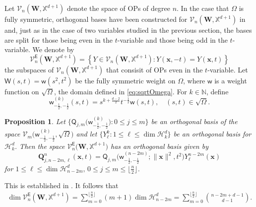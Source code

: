 \documentclass{amsart}
\newtheorem{prop}[thm]{Proposition}
\theoremstyle{remark}
\def\sw{{\mathsf w}}
\def\sE{{\mathsf E}}
\def\sO{{\mathsf O}}
\def\sQ{{\mathsf Q}}
\def\sW{{\mathsf W}}
\def\xb{{\mathbf x}}
\def\Qb{{\mathbf Q}}
\def\Wb{{\mathbf W}}
\def\CH{{\mathcal H}}
\def\CV{{\mathcal V}}
\def\NN{{\mathbb N}}
\def\XX{{\mathbb X}}
\def\f{\frac}
\begin{document}
Let $\CV_n(\Wb, \XX^{d+1})$ denote the space of OPs of degree $n$. In the case that $\Omega$ is fully
symmetric, orthogonal bases have been constructed for $\CV_n(\Wb, \XX^{d+1})$ in \cite{X24} and, just 
as in the case of two variables studied in the previous section, the bases are split for those being even 
in the $t$-variable and those being odd in the $t$-variable. We denote by 
$$
      \CV_n^{\sE}(\Wb, \XX^{d+1}) = \left\{Y \in \CV_n(\Wb, \XX^{d+1}): Y(\xb, - t) = Y(\xb,t) \right\}
$$ 
the subspaces of $\CV_n(\Wb, \XX^{d+1})$ that consisit of OPs even in the $t$-variable. 
Let $\sW(s,t) = \sw(s^2,t^2)$ be the fully symmetric weight on $\Omega$, where $\sw$ is a 
weight function on $\sqrt{\Omega}$, the domain defined in \eqref{eq:sqrtOmega}. For $k \in \NN$, define 
\begin{equation} \label{eq:Wk_fullsym}
    \sw_{-\f12, -\f12}^{(k)}(s,t) = s^{k+\frac{d-2}{2}} t^{-\f12} \sw(s,t), \quad (s,t) \in \sqrt{\Omega}. 
\end{equation}

\begin{prop} \label{prop:OP_fullSym}
Let $\big\{\sQ_{j,m}\big(\sw^{(k)}_{-\f12, -\f12}\big): 0 \le j \le m\big\}$ be an orthogonal basis of the
space $\CV_m\big(\sw^{(k)}_{- \f12, -\f12}, \sqrt{\Omega}\big)$ and let $\{Y_\ell^k: 1 \le \ell \le \dim \CH_k^d\}$ be 
an orthogonal basis for $\CH_k^d$. Then the space $\CV_n^\sE\big(\Wb,\XX^{d+1}\big)$ has an 
orthogonal basis given by 
\begin{equation} \label{eq:basisE}
 \Qb_{j,n-2m,\ell}^n(\xb,t) =  \sQ_{j,m} \Big(\sw_{-\f12, -\f12}^{(n-2m)}; \|\xb\|^2, t^2\Big) Y_\ell^{n-2m} (\xb)
\end{equation}
for $1 \le \ell \le \dim \CH_{n-2m}^d, \,0\le j \le  m \le \lfloor \frac{n}{2} \rfloor$.
\end{prop}

This is established in \cite[Proposition 4.5]{X24}. It follows that 
\begin{align*}
  \dim \CV_n^\sE(\Wb,\XX^{d+1}) = %
     \sum_{m=0}^{\lfloor \frac{n}{2} \rfloor} (m+1) \dim \CH_{n-2m}^d = 
        \sum_{m=0}^{\lfloor \frac{n}{2} \rfloor} \binom{n-2m+d-1}{d-1}. %
\end{align*}
\end{document}
